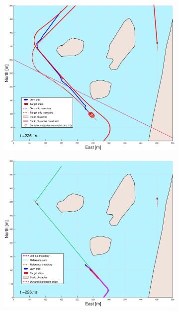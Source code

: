 \begin{figure}[ht]
\begin{subfigure}[b]{0.494\textwidth}
        \subcaption{}
    \end{subfigure}
    \hfill
    \\
    \begin{subfigure}[b]{0.494\textwidth}
        \centering
        \includegraphics[width=\textwidth]{Images/Figures/Helloya_Rev/_Simple_1fig1_time=226}
        \subcaption{}
    \end{subfigure}
    \hfill
    \begin{subfigure}[b]{0.494\textwidth}
        \centering
        \includegraphics[width=\textwidth]{Images/Figures/Helloya_Rev/_Simple_1fig999_time=226}

\end{subfigure}
\end{figure}
